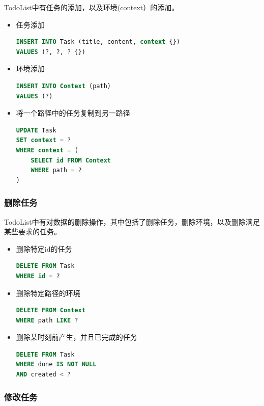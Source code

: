 \documentclass[logo,reportComp]{thesis}
\begin{document}
TodoList中有任务的添加，以及环境(context）的添加。
\begin{itemize}
\item 任务添加
\begin{lstlisting}[language=SQL]
INSERT INTO Task (title, content, context {})
VALUES (?, ?, ? {})
\end{lstlisting}
\item 环境添加
\begin{lstlisting}[language=SQL]
INSERT INTO Context (path)
VALUES (?)
\end{lstlisting}
\item 将一个路径中的任务复制到另一路径
\begin{lstlisting}[language=SQL]
UPDATE Task
SET context = ?
WHERE context = (
	SELECT id FROM Context
	WHERE path = ?
)
\end{lstlisting}
\end{itemize}

\subsubsection{删除任务}

TodoList中有对数据的删除操作，其中包括了删除任务，删除环境，以及删除满足某些要求的任务。
\begin{itemize}
\item 删除特定id的任务
\begin{lstlisting}[language=SQL]
DELETE FROM Task
WHERE id = ?
\end{lstlisting}
\item 删除特定路径的环境
\begin{lstlisting}[language=SQL]
DELETE FROM Context
WHERE path LIKE ?
\end{lstlisting}
\item 删除某时刻前产生，并且已完成的任务
\begin{lstlisting}[language=SQL]
DELETE FROM Task
WHERE done IS NOT NULL
AND created < ?
\end{lstlisting}
\end{itemize}

\subsubsection{修改任务}
\end{document}
